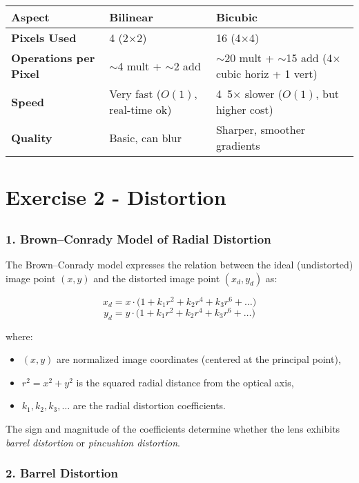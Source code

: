 \documentclass[12pt]{article}
\begin{document}
\begin{tabular}{|p{2.5cm}|p{5cm}|p{5cm}|}
\hline
\textbf{Aspect} & \textbf{Bilinear} & \textbf{Bicubic} \\
\hline
\textbf{Pixels Used} & 4 (2$\times$2) & 16 (4$\times$4) \\
\hline
\textbf{Operations per Pixel} & $\sim$4 mult + $\sim$2 add & $\sim$20 mult + $\sim$15 add (4$\times$ cubic horiz + 1 vert) \\
\hline
\textbf{Speed} & Very fast ($O(1)$, real-time ok) & 4~5$\times$ slower ($O(1)$, but higher cost) \\
\hline
\textbf{Quality} & Basic, can blur & Sharper, smoother gradients \\
\hline
\end{tabular}

\newpage
\section{Exercise 2 - Distortion}
\subsection{}
\subsubsection*{1. Brown--Conrady Model of Radial Distortion}

The Brown--Conrady model expresses the relation between the ideal (undistorted) image point 
$(x, y)$ and the distorted image point $(x_d, y_d)$ as:

\[
x_d = x \cdot \big( 1 + k_1 r^2 + k_2 r^4 + k_3 r^6 + \dots \big)
\]
\[
y_d = y \cdot \big( 1 + k_1 r^2 + k_2 r^4 + k_3 r^6 + \dots \big)
\]

where:
\begin{itemize}
    \item $(x, y)$ are normalized image coordinates (centered at the principal point),
    \item $r^2 = x^2 + y^2$ is the squared radial distance from the optical axis,
    \item $k_1, k_2, k_3, \dots$ are the radial distortion coefficients.
\end{itemize}

The sign and magnitude of the coefficients determine whether the lens exhibits 
\emph{barrel distortion} or \emph{pincushion distortion}.

\subsubsection*{2. Barrel Distortion}
\end{document}
